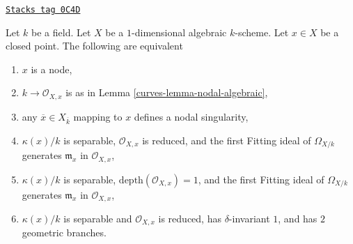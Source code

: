 \begin{lemma}[Nodal]
\label{curves-lemma-nodal}
\href{https://stacks.math.columbia.edu/tag/0C4D}{\texttt{Stacks tag 0C4D}}

Let $k$ be a field. Let $X$ be a $1$-dimensional algebraic $k$-scheme.
Let $x \in X$ be a closed point. The following are equivalent
\begin{enumerate}
\item $x$ is a node,
\item $k \to \mathcal{O}_{X, x}$ is as in Lemma \ref{curves-lemma-nodal-algebraic},
\item any $\overline{x} \in X_{\overline{k}}$ mapping to $x$ defines
a nodal singularity,
\item $\kappa(x)/k$ is separable, $\mathcal{O}_{X, x}$ is reduced, and
the first Fitting ideal of $\Omega_{X/k}$ generates $\mathfrak m_x$
in $\mathcal{O}_{X, x}$,
\item $\kappa(x)/k$ is separable, $\text{depth}(\mathcal{O}_{X, x}) = 1$, and
the first Fitting ideal of $\Omega_{X/k}$ generates $\mathfrak m_x$
in $\mathcal{O}_{X, x}$,
\item $\kappa(x)/k$ is separable and $\mathcal{O}_{X, x}$ is reduced, has
$\delta$-invariant $1$, and has $2$ geometric branches.
\end{enumerate}
\end{lemma}

